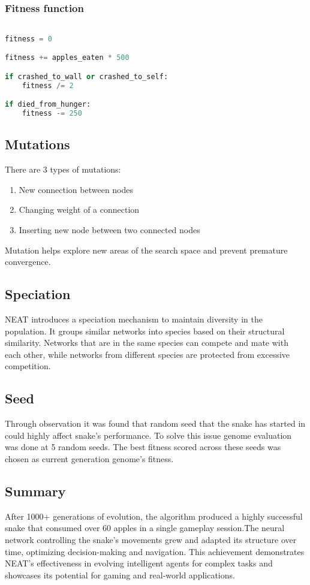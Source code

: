 \subsubsection{Fitness function}

\begin{lstlisting}[language=Python]

fitness = 0

fitness += apples_eaten * 500

if crashed_to_wall or crashed_to_self:
    fitness /= 2

if died_from_hunger:
    fitness -= 250

\end{lstlisting}

\subsection{Mutations}

There are 3 types of mutations:

\begin{enumerate}
    \item New connection between nodes
    \item Changing weight of a connection
    \item Inserting new node between two connected nodes 
\end{enumerate}

Mutation helps explore new areas of the search space and prevent premature convergence.

\subsection{Speciation}

NEAT introduces a speciation mechanism to maintain diversity in the population. It groups similar networks into species based on their structural similarity. Networks that are in the same species can compete and mate with each other, while networks from different species are protected from excessive competition.

\subsection{Seed}

Through observation it was found that random seed that the snake has started in could highly affect snake's performance. To solve this issue genome evaluation was done at 5 random seeds. The best fitness scored across these seeds was chosen as current generation genome's fitness.

\subsection{Summary}

After 1000+ generations of evolution, the algorithm produced a highly successful snake that consumed over 60 apples in a single gameplay session.The neural network controlling the snake's movements grew and adapted its structure over time, optimizing decision-making and navigation. This achievement demonstrates NEAT's effectiveness in evolving intelligent agents for complex tasks and showcases its potential for gaming and real-world applications.
